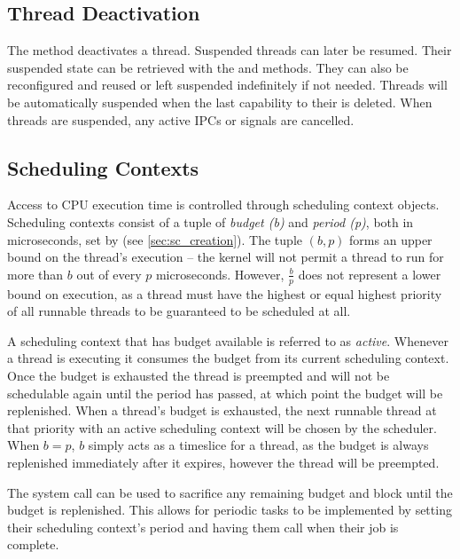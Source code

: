 \subsection{Thread Deactivation}
\label{sec:thread_deactivation}

The  method deactivates a thread.
Suspended threads can later be resumed.
Their suspended state can be retrieved with the 
 and
 methods.
They can also be reconfigured and
reused or left suspended indefinitely if not needed. Threads will be
automatically suspended when the last capability to their  is
deleted.
When threads are suspended, any active IPCs or signals are cancelled.

\subsection{Scheduling Contexts}
\label{sec:scheduling_contexts}

Access to CPU execution time is controlled through scheduling context objects.
Scheduling contexts consist of a tuple of 
\textit{budget (b)} and \textit{period (p)}, both in microseconds, set by  (see \autoref{sec:sc_creation}).
The tuple $(b, p)$ forms an upper bound on the thread's execution -- 
the kernel will not permit a thread to run for more than $b$ out of every $p$ microseconds.
However, $\frac{b}{p}$ does not represent a lower bound on execution, as a thread must have the highest or equal highest priority of all runnable threads to be guaranteed to be scheduled at all.

A scheduling context that has budget available is referred to as \emph{active}.
Whenever a thread is executing it consumes the budget from its current scheduling context.
Once the budget is exhausted the thread is preempted and will not be schedulable again until the period has passed, at which 
point the budget will be replenished.
When a thread's budget is exhausted, the next runnable thread at that priority with an active scheduling context will be chosen by the scheduler.
When $b = p$, $b$ simply acts as a timeslice for a thread, as the budget is always replenished immediately after it expires, however the thread will be preempted.

The system call  can be used to sacrifice any remaining budget and block until the budget is replenished.
This allows for periodic tasks to be implemented by setting their scheduling context's period and having them call  when their job is complete.

